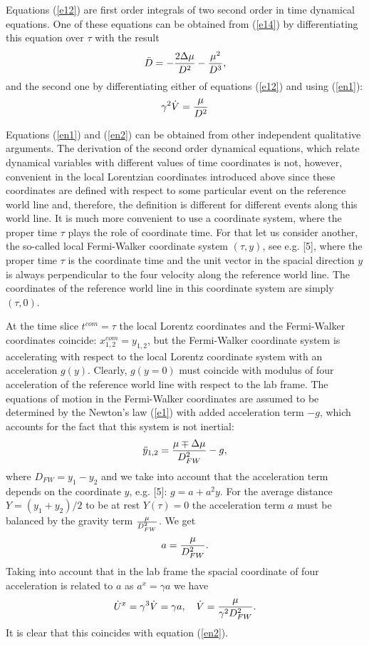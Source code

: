 \documentclass[aip,nofootinbib]{revtex4}
\begin{document}
Equations (\ref{e12}) are first order integrals of two second
order in time dynamical equations. One of these  equations can be
obtained from (\ref{e14}) by differentiating this equation over
$\tau $ with the result
\begin{equation}
\ddot D= -{2\Delta \mu \over D^{2}}-{\mu^2\over D^3}, \label{en1}
\end{equation}
and the second one by differentiating either of equations
(\ref{e12}) and using (\ref{en1}):
\begin{equation}
\gamma^{2}\dot V={\mu \over D^2} \label{en2}
\end{equation}

Equations (\ref{en1}) and (\ref{en2}) can be obtained from other
independent qualitative arguments. The derivation of the second
order dynamical equations, which relate dynamical variables with
different values of time coordinates is not, however, convenient
in the local Lorentzian coordinates introduced above since these
coordinates are defined with respect to some particular event on
the reference world line and, therefore, the definition is
different for different events along this world line. It is much
more convenient to use a coordinate system, where the proper time
$\tau $ plays the role of coordinate time. For that let us
consider another, the so-called local Fermi-Walker coordinate
system $(\tau, y)$, see e.g. [5], where the proper time $\tau $ is
the coordinate time and the unit vector in the spacial direction
$y$ is always perpendicular to the four velocity along the
reference world line. The coordinates of the reference world line
in this coordinate system are simply $(\tau, 0)$.

At the time slice $t^{com}=\tau $ the local Lorentz coordinates
and the Fermi-Walker coordinates coincide:
$x^{com}_{1,2}=y_{1,2}$, but the Fermi-Walker coordinate system is
accelerating with respect to the local Lorentz coordinate system
with an acceleration $g(y)$. Clearly, $g(y=0)$ must coincide with
modulus of four acceleration of the reference world line with
respect to the lab frame. The equations of motion in the
Fermi-Walker coordinates are assumed to be determined by the
Newton's law (\ref{e1}) with added acceleration term $-g$, which
accounts for the fact that this system is not inertial:
\begin{equation}
\ddot y_{1,2}={\mu \mp \Delta \mu\over D^{2}_{FW}}-g,
\label{en3}
\end{equation}
where $D_{FW}=y_1-y_2$ and we take into account that the
acceleration term depends on the coordinate $y$, e.g. [5]:
$g=a+a^2y$. For the average distance $Y=(y_1+y_2)/2$ to be at rest
$Y(\tau)=0$ the acceleration term $a$ must be balanced by the
gravity term ${\mu \over D^{2}_{FW}}$. We get
\begin{equation}
a={\mu \over D^{2}_{FW}}. \label{en4}
\end{equation}
Taking into account that in the lab frame the spacial coordinate
of four acceleration is related to $a$ as $a^x=\gamma a$ we have
\begin{equation}
\dot U^x=\gamma^3\dot V=\gamma a, \quad \dot V= {\mu \over
\gamma^2 D^{2}_{FW}}. \label{en5}
\end{equation}
It is clear that this coincides with equation (\ref{en2}).
\end{document}
